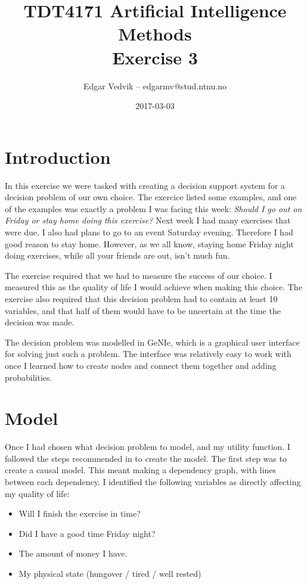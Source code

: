 \documentclass{article}
\title{TDT4171 Artificial Intelligence Methods\\ Exercise 3}
\author{Edgar Vedvik -- edgarmv@stud.ntnu.no}
\date{2017-03-03}
\begin{document}
\maketitle


\section*{Introduction}
    In this exercise we were tasked with creating a decision support system for
    a decision problem of our own choice. The exercice listed some examples,
    and one of the examples was exactly a problem I was facing this week:
    \emph{Should I go out on Friday or stay home doing this exercise?} Next week
    I had many exercises that were due. I also had plans to go to an event
    Saturday evening. Therefore I had good reason to stay home. However, as
    we all know, staying home Friday night doing exercises, while all your
    friends are out, isn't much fun.
    
    The exercise required that we had to measure the success of our choice. I
    measured this as the quality of life I would achieve when making this
    choice. The exercise also required that this decision problem had to
    contain at least 10 variables, and that half of them would have to be
    uncertain at the time the decision was made.

    The decision problem was modelled in GeNIe, which is a graphical user
    interface for solving just such a problem. The interface was relatively
    easy to work with once I learned how to create nodes and connect them
    together and adding probabilities.

\section*{Model}

    Once I had chosen what decision problem to model, and my utility function.
    I followed the steps recommended in  to create
    the model. The first step was to create a causal model. This meant making a
    dependency graph, with lines between each dependency. I identified the
    following variables as directly affecting my quality of life:
    \begin{itemize}
        \item Will I finish the exercise in time?
        \item Did I have a good time Friday night?
        \item The amount of money I have.
        \item My physical state (hungover / tired / well rested)
    \end{itemize}
\end{document}
